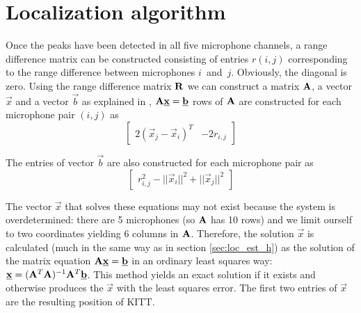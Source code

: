 \documentclass[11pt,titlepage]{report}
\begin{document}
\section{Localization algorithm}
\label{sec:loc_alg}
Once the peaks have been detected in all five microphone channels, a range difference matrix can be constructed consisting of entries $r(i,j)$ corresponding to the range difference between microphones $i$~and~$j$. Obviously, the diagonal is zero. 
Using the range difference matrix $\mathbf{R}$ we can construct a matrix $\mathbf{A}$, a vector $\vec{x}$ and a vector $\vec{b}$ as explained in \cite{epo4-manual}, $\mathbf{A}\mathbf{\underline{x}}=\mathbf{\underline{b}}$ rows of $\mathbf{A}$ are constructed for each microphone pair $(i,j)$ as
\begin{equation}
\begin{bmatrix}
2(\vec{x}_j-\vec{x}_i)^T & -2r_{i,j}
\end{bmatrix}
\end{equation}

The entries of vector $\vec{b}$ are also constructed for each microphone pair as
\begin{equation}
\begin{bmatrix}
r_{i,j}^2-||\vec{x}_i||^2+||\vec{x}_j||^2
\end{bmatrix}
\end{equation}

The vector $\vec{x}$ that solves these equations may not exist because the system is overdetermined: there are \num{5} microphones (so $\mathbf{A}$ has \num{10} rows) and we limit ourself to two coordinates yielding \num{6} columns in $\mathbf{A}$. Therefore, the solution $\vec{x}$ is calculated (much in the same way as in section \ref{sec:loc_est_h}) as the solution of the matrix equation $\mathbf{A}\mathbf{\underline{x}}=\mathbf{\underline{b}}$ in an ordinary least squares way: $\mathbf{\underline{x}}=(\mathbf{A}^T\mathbf{A})^{-1}\mathbf{A}^T\mathbf{\underline{b}}$. This method yields an exact solution if it exists and otherwise produces the $\vec{x}$ with the least squares error. The first two entries of $\vec{x}$ are the resulting position of KITT. 
\end{document}
